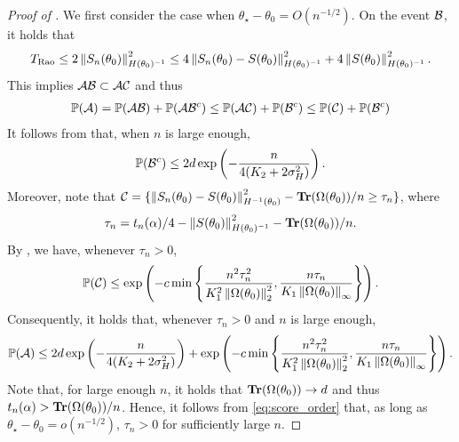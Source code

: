 \begin{proof}[Proof of ]
    We first consider the case when $\theta_\star - \theta_0 = O(n^{-1/2})$.
    On the event $\mathcal{B}$, it holds that
    \begin{align*}
        T_{\text{Rao}}
        \le 2 \left\lVert S_n(\theta_0) \right\rVert_{H(\theta_0)^{-1}}^2
        \le 4 \left\lVert S_n(\theta_0) - S(\theta_0) \right\rVert_{H(\theta_0)^{-1}}^2 + 4 \left\lVert S(\theta_0) \right\rVert_{H(\theta_0)^{-1}}^2.
    \end{align*}
    This implies $\mathcal{A} \mathcal{B} \subset \mathcal{A} \mathcal{C}$ and thus
    \begin{align*}
        \operatorname{\mathbb P}(\mathcal{A}) = \operatorname{\mathbb P}(\mathcal{A} \mathcal{B}) + \operatorname{\mathbb P}(\mathcal{A} \mathcal{B}^c) \le \operatorname{\mathbb P}(\mathcal{A} \mathcal{C}) + \operatorname{\mathbb P}(\mathcal{B}^c) \le \operatorname{\mathbb P}(\mathcal{C}) + \operatorname{\mathbb P}(\mathcal{B}^c)
    \end{align*}
    It follows from  that, when $n$ is large enough,
    \begin{align*}
        \operatorname{\mathbb P}(\mathcal{B}^c) \le 2d \exp\left( - \frac{n}{4(K_2 + 2\sigma_H^2)} \right).
    \end{align*}
    Moreover, note that $\mathcal{C} = \{ \left\lVert S_n(\theta_0) - S(\theta_0) \right\rVert_{H^{-1}(\theta_0)}^2 - \operatorname{\bf Tr}(\Omega(\theta_0))/n \ge \tau_n \}$, where
    \begin{align*}
        \tau_n = t_n(\alpha)/4 - \left\lVert S(\theta_0) \right\rVert_{H(\theta_0)^{-1}}^{2} - \operatorname{\bf Tr}(\Omega(\theta_0))/n.
    \end{align*}
    By , we have, whenever $\tau_n > 0$,
    \begin{align*}
        \operatorname{\mathbb P}(\mathcal{C}) \le \exp\left( -c\min\left\{ \frac{n^2 \tau_n^2}{K_1^2 \left\lVert \Omega(\theta_0) \right\rVert_2^2}, \frac{n\tau_n}{K_1 \left\lVert \Omega(\theta_0) \right\rVert_\infty} \right\} \right).
    \end{align*}
    Consequently, it holds that, whenever $\tau_n > 0$ and $n$ is large enough,
    \begin{align*}
        \operatorname{\mathbb P}(\mathcal{A}) \le 2d \exp\left( - \frac{n}{4(K_2 + 2\sigma_H^2)} \right) + \exp\left( -c\min\left\{ \frac{n^2 \tau_n^2}{K_1^2 \left\lVert \Omega(\theta_0) \right\rVert_2^2}, \frac{n\tau_n}{K_1 \left\lVert \Omega(\theta_0) \right\rVert_\infty} \right\} \right).
    \end{align*}
    Note that, for large enough $n$, it holds that $\operatorname{\bf Tr}(\Omega(\theta_0)) \rightarrow d$ and thus $t_n(\alpha) > \operatorname{\bf Tr}(\Omega(\theta_0))/n$.
    Hence, it follows from \eqref{eq:score_order} that, as long as $\theta_\star - \theta_0 = o(n^{-1/2})$, $\tau_n > 0$ for sufficiently large $n$.
    

\end{proof}
